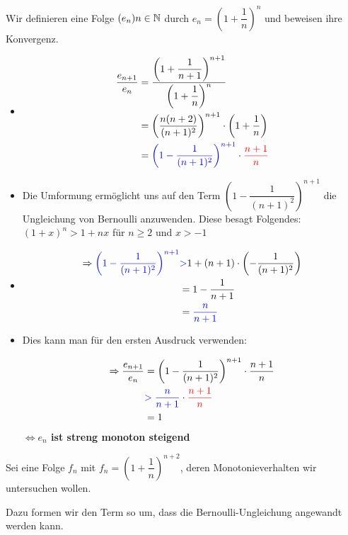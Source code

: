 \documentclass[main.tex]{subfiles}
\begin{document}
Wir definieren eine Folge $(e_{n})n\in\mathbb{N}$ durch $e_{n}=\left(1+\dfrac{1}{n}\right)^n$ und beweisen ihre Konvergenz.

\begin{itemize}
	\item \begin{align*}
		\dfrac{e_{n+1}}{e_{n}}&=\dfrac{{\left(1+\dfrac{1}{n+1}\right)}^{n+1}}{{\left(1+\dfrac{1}{n}\right)}^{n}} \\
		& = \left(\dfrac{n(n+2)}{(n+1)^2}\right)^{n+1}\cdot\left(1+\dfrac{1}{n}\right) \\
		& = \textcolor{blue}{\left(1-\dfrac{1}{(n+1)^2}\right)^{n+1}}\cdot\textcolor{red}{\dfrac{n+1}{n}}
	\end{align*}

	\item Die Umformung ermöglicht uns auf den Term $\left(1-\dfrac{1}{(n+1)^2}\right)^{n+1}$ die Ungleichung von Bernoulli anzuwenden. Diese besagt Folgendes: $(1+x)^n>1+nx$ für $n\geq2$ und $x> -1$
	\item \begin{align*}
			\Rightarrow\textcolor{blue}{\left(1-\dfrac{1}{(n+1)^2}\right)^{n+1}}&\textcolor{blue}{>} 1+(n+1)\cdot\left(-\dfrac{1}{(n+1)^2}\right) \\
			& = 1-\dfrac{1}{n+1} \\
			& = \textcolor{blue}{\dfrac{n}{n+1}}
		\end{align*}

	\item Dies kann man für den ersten Ausdruck verwenden:
	
	\begin{align*}
		\Rightarrow\dfrac{e_{n+1}}{e_{n}}&=\left(1-\dfrac{1}{(n+1)^2}\right)^{n+1}\cdot\dfrac{n+1}{n} \\
		& \textcolor{blue}{>\dfrac{n}{n+1}}\cdot\textcolor{red}{\dfrac{n+1}{n}} \\
		& = 1
	\end{align*}
	\textbf{$\Leftrightarrow e_{n}$ ist streng monoton steigend}
\end{itemize}

Sei eine Folge $f_{n}$ mit $f_{n}=\left(1+\dfrac{1}{n}\right)^{n+2}$, deren Monotonieverhalten wir untersuchen wollen.

Dazu formen wir den Term so um, dass die Bernoulli-Ungleichung angewandt werden kann.
\end{document}

